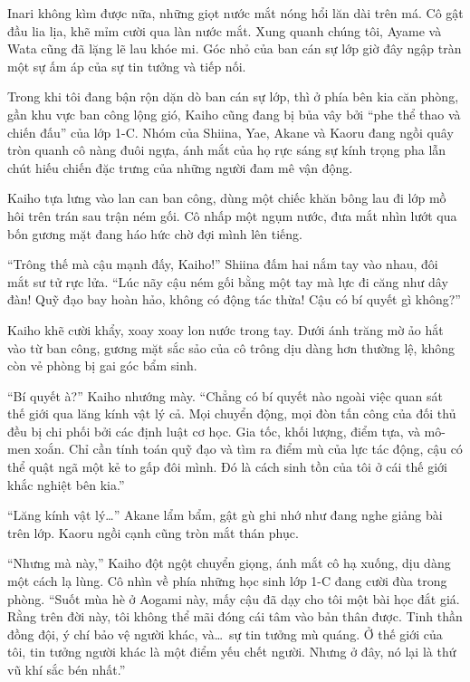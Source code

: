 \documentclass[../main.tex]{subfiles}
\begin{document}
Inari không kìm được nữa, những giọt nước mắt nóng hổi lăn dài trên má. Cô gật đầu lia lịa, khẽ mỉm cười qua làn nước mắt. Xung quanh chúng tôi, Ayame và Wata cũng đã lặng lẽ lau khóe mi. Góc nhỏ của ban cán sự lớp giờ đây ngập tràn một sự ấm áp của sự tin tưởng và tiếp nối.

\ct

Trong khi tôi đang bận rộn dặn dò ban cán sự lớp, thì ở phía bên kia căn phòng, gần khu vực ban công lộng gió, Kaiho cũng đang bị bủa vây bởi ``phe thể thao và chiến đấu'' của lớp 1-C. Nhóm của Shiina, Yae, Akane và Kaoru đang ngồi quây tròn quanh cô nàng đuôi ngựa, ánh mắt của họ rực sáng sự kính trọng pha lẫn chút hiếu chiến đặc trưng của những người đam mê vận động.

Kaiho tựa lưng vào lan can ban công, dùng một chiếc khăn bông lau đi lớp mồ hôi trên trán sau trận ném gối. Cô nhấp một ngụm nước, đưa mắt nhìn lướt qua bốn gương mặt đang háo hức chờ đợi mình lên tiếng.

``Trông thế mà cậu mạnh đấy, Kaiho!'' Shiina đấm hai nắm tay vào nhau, đôi mắt sư tử rực lửa. ``Lúc nãy cậu ném gối bằng một tay mà lực đi căng như dây đàn! Quỹ đạo bay hoàn hảo, không có động tác thừa! Cậu có bí quyết gì không?''

Kaiho khẽ cười khẩy, xoay xoay lon nước trong tay. Dưới ánh trăng mờ ảo hắt vào từ ban công, gương mặt sắc sảo của cô trông dịu dàng hơn thường lệ, không còn vẻ phòng bị gai góc bẩm sinh.

``Bí quyết à?'' Kaiho nhướng mày. ``Chẳng có bí quyết nào ngoài việc quan sát thế giới qua lăng kính vật lý cả. Mọi chuyển động, mọi đòn tấn công của đối thủ đều bị chi phối bởi các định luật cơ học. Gia tốc, khối lượng, điểm tựa, và mô-men xoắn. Chỉ cần tính toán quỹ đạo và tìm ra điểm mù của lực tác động, cậu có thể quật ngã một kẻ to gấp đôi mình. Đó là cách sinh tồn của tôi ở cái thế giới khắc nghiệt bên kia.''

``Lăng kính vật lý\dots'' Akane lẩm bẩm, gật gù ghi nhớ như đang nghe giảng bài trên lớp. Kaoru ngồi cạnh cũng tròn mắt thán phục.

``Nhưng mà này,'' Kaiho đột ngột chuyển giọng, ánh mắt cô hạ xuống, dịu dàng một cách lạ lùng. Cô nhìn về phía những học sinh lớp 1-C đang cười đùa trong phòng. ``Suốt mùa hè ở Aogami này, mấy cậu đã dạy cho tôi một bài học đắt giá. Rằng trên đời này, tôi không thể mãi đóng cái tâm vào bản thân được. Tinh thần đồng đội, ý chí bảo vệ người khác, và\dots\ sự tin tưởng mù quáng. Ở thế giới của tôi, tin tưởng người khác là một điểm yếu chết người. Nhưng ở đây, nó lại là thứ vũ khí sắc bén nhất.''
\end{document}
